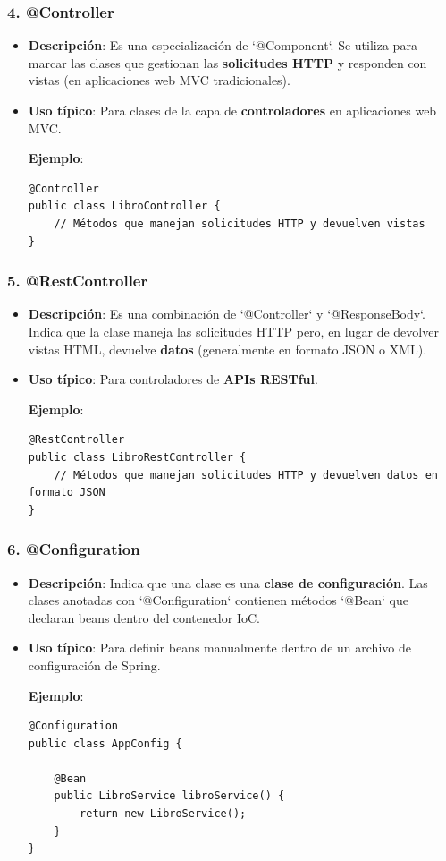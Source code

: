 \documentclass[11pt]{article}
\begin{document}
\subsubsection{4. \textbf{\textbf{@Controller}}}
\label{sec:org4defc11}
\begin{itemize}
\item \textbf{\textbf{Descripción}}: Es una especialización de `@Component`. Se utiliza para marcar las clases que gestionan las \textbf{\textbf{solicitudes HTTP}} y responden con vistas (en aplicaciones web MVC tradicionales).
\item \textbf{\textbf{Uso típico}}: Para clases de la capa de \textbf{\textbf{controladores}} en aplicaciones web MVC.

\textbf{\textbf{Ejemplo}}:
\begin{verbatim}
@Controller
public class LibroController {
    // Métodos que manejan solicitudes HTTP y devuelven vistas
}
\end{verbatim}
\end{itemize}

\subsubsection{5. \textbf{\textbf{@RestController}}}
\label{sec:orgd6105a2}
\begin{itemize}
\item \textbf{\textbf{Descripción}}: Es una combinación de `@Controller` y `@ResponseBody`. Indica que la clase maneja las solicitudes HTTP pero, en lugar de devolver vistas HTML, devuelve \textbf{\textbf{datos}} (generalmente en formato JSON o XML).
\item \textbf{\textbf{Uso típico}}: Para controladores de \textbf{\textbf{APIs RESTful}}.

\textbf{\textbf{Ejemplo}}:
\begin{verbatim}
@RestController
public class LibroRestController {
    // Métodos que manejan solicitudes HTTP y devuelven datos en formato JSON
}
\end{verbatim}
\end{itemize}

\subsubsection{6. \textbf{\textbf{@Configuration}}}
\label{sec:org55230df}
\begin{itemize}
\item \textbf{\textbf{Descripción}}: Indica que una clase es una \textbf{\textbf{clase de configuración}}. Las clases anotadas con `@Configuration` contienen métodos `@Bean` que declaran beans dentro del contenedor IoC.
\item \textbf{\textbf{Uso típico}}: Para definir beans manualmente dentro de un archivo de configuración de Spring.

\textbf{\textbf{Ejemplo}}:
\begin{verbatim}
@Configuration
public class AppConfig {

    @Bean
    public LibroService libroService() {
        return new LibroService();
    }
}
\end{verbatim}
\end{itemize}
\end{document}
